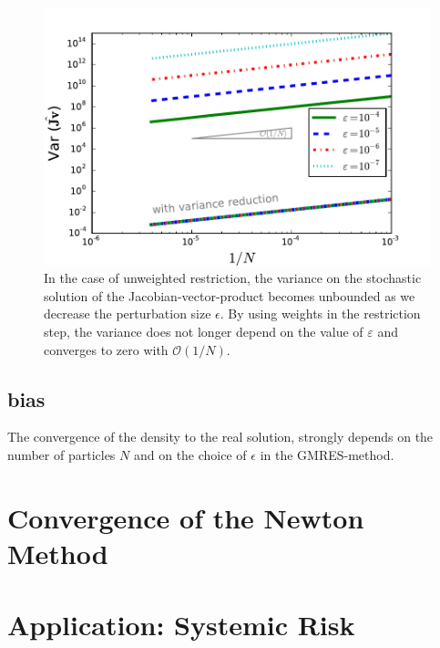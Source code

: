 \documentclass[]{article}
\theoremstyle{definition}
\begin{document}
\begin{figure}
\centering
\includegraphics[width=0.8\linewidth]{../Problems/Particles/checkSystem/plots/Var_N_eps_nw}
\caption[Effect of variance reduction]{In the case of unweighted restriction, the variance on the stochastic solution of the Jacobian-vector-product becomes unbounded as we decrease the perturbation size $\epsilon$. By using weights in the restriction step, the variance does not longer depend on the value of $\varepsilon$ and   converges to zero with $\mathcal{O}(1/ N)$.}
\label{Var_N}
\end{figure}

%

\subsection{bias}


The convergence of the density to the real solution, strongly depends on the number of particles $N$ and on the choice of $\epsilon$ in the GMRES-method. 








\section{Convergence of the Newton Method}



\section{Application: Systemic Risk}













\end{document}
